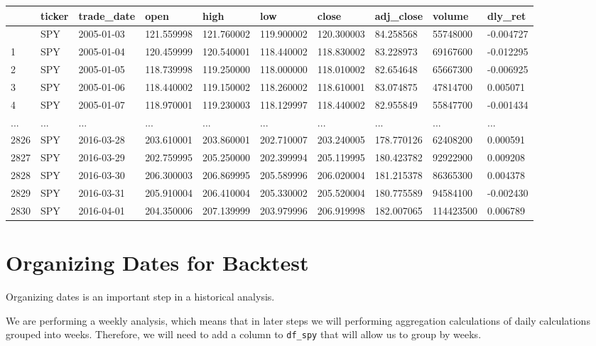 \documentclass[
  letterpaper,
  DIV=11,
  numbers=noendperiod]{scrreprt}
\begin{document}
\begin{longtable}[]{@{}llllllllll@{}}
\toprule\noalign{}
& ticker & trade\_date & open & high & low & close & adj\_close & volume
& dly\_ret \\
\midrule\noalign{}
\endhead
\bottomrule\noalign{}
\endlastfoot
0 & SPY & 2005-01-03 & 121.559998 & 121.760002 & 119.900002 & 120.300003
& 84.258568 & 55748000 & -0.004727 \\
1 & SPY & 2005-01-04 & 120.459999 & 120.540001 & 118.440002 & 118.830002
& 83.228973 & 69167600 & -0.012295 \\
2 & SPY & 2005-01-05 & 118.739998 & 119.250000 & 118.000000 & 118.010002
& 82.654648 & 65667300 & -0.006925 \\
3 & SPY & 2005-01-06 & 118.440002 & 119.150002 & 118.260002 & 118.610001
& 83.074875 & 47814700 & 0.005071 \\
4 & SPY & 2005-01-07 & 118.970001 & 119.230003 & 118.129997 & 118.440002
& 82.955849 & 55847700 & -0.001434 \\
... & ... & ... & ... & ... & ... & ... & ... & ... & ... \\
2826 & SPY & 2016-03-28 & 203.610001 & 203.860001 & 202.710007 &
203.240005 & 178.770126 & 62408200 & 0.000591 \\
2827 & SPY & 2016-03-29 & 202.759995 & 205.250000 & 202.399994 &
205.119995 & 180.423782 & 92922900 & 0.009208 \\
2828 & SPY & 2016-03-30 & 206.300003 & 206.869995 & 205.589996 &
206.020004 & 181.215378 & 86365300 & 0.004378 \\
2829 & SPY & 2016-03-31 & 205.910004 & 206.410004 & 205.330002 &
205.520004 & 180.775589 & 94584100 & -0.002430 \\
2830 & SPY & 2016-04-01 & 204.350006 & 207.139999 & 203.979996 &
206.919998 & 182.007065 & 114423500 & 0.006789 \\
\end{longtable}

\hypertarget{organizing-dates-for-backtest}{%
\section{Organizing Dates for
Backtest}\label{organizing-dates-for-backtest}}

Organizing dates is an important step in a historical analysis.

We are performing a weekly analysis, which means that in later steps we
will performing aggregation calculations of daily calculations grouped
into weeks. Therefore, we will need to add a column to \texttt{df\_spy}
that will allow us to group by weeks.
\end{document}
